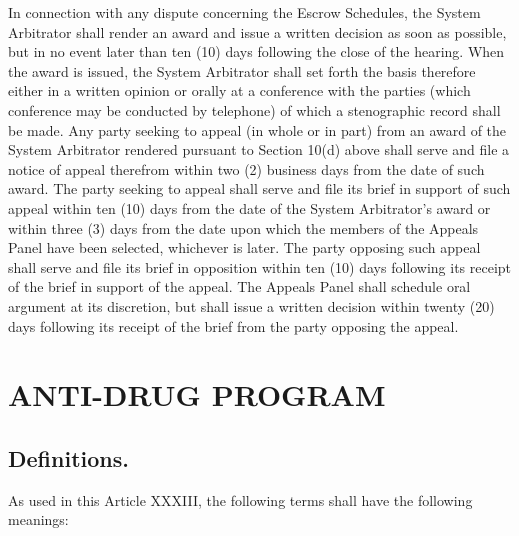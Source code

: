 \documentclass[
]{book}
\begin{document}
\begin{enumerate}
  In connection with any dispute concerning the Escrow Schedules, the System Arbitrator shall render an award and issue a written decision as soon as possible, but in no event later than ten (10) days following the close of the hearing. When the award is issued, the System Arbitrator shall set forth the basis therefore either in a written opinion or orally at a conference with the parties (which conference may be conducted by telephone) of which a stenographic record shall be made. Any party seeking to appeal (in whole or in part) from an award of the System Arbitrator rendered pursuant to Section 10(d) above shall serve and file a notice of appeal therefrom within two (2) business days from the date of such award. The party seeking to appeal shall serve and file its brief in support of such appeal within ten (10) days from the date of the System Arbitrator's award or within three (3) days from the date upon which the members of the Appeals Panel have been selected, whichever is later. The party opposing such appeal shall serve and file its brief in opposition within ten (10) days following its receipt of the brief in support of the appeal. The Appeals Panel shall schedule oral argument at its discretion, but shall issue a written decision within twenty (20) days following its receipt of the brief from the party opposing the appeal.
\end{enumerate}

\hypertarget{anti-drug-program}{%
\chapter{ANTI-DRUG PROGRAM}\label{anti-drug-program}}

\hypertarget{definitions.-2}{%
\section{Definitions.}\label{definitions.-2}}

As used in this Article XXXIII, the following terms shall have the following meanings:
\end{document}
